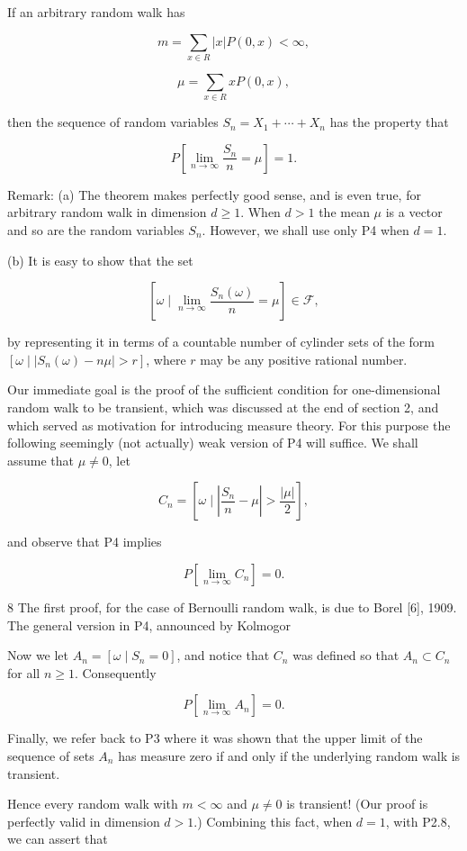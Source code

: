 If an arbitrary random walk has

$$m = \sum_{x \in R} |x| P(0,x) < \infty,$$

$$\mu = \sum_{x \in R} xP(0,x),$$

then the sequence of random variables $S_n = X_1 + \cdots + X_n$ has the property that

$$P\left[ \lim_{n \to \infty} \frac{S_n}{n} = \mu \right] = 1.$$

Remark: (a) The theorem makes perfectly good sense, and is even true, for arbitrary random walk in dimension $d \geq 1$. When $d > 1$ the mean $\mu$ is a vector and so are the random variables $S_n$. However, we shall use only P4 when $d = 1$.

(b) It is easy to show that the set

$$\left[ \omega \mid \lim_{n \to \infty} \frac{S_n(\omega)}{n} = \mu \right] \in \mathcal{F},$$

by representing it in terms of a countable number of cylinder sets of the form $[\omega \mid |S_n(\omega) - n\mu| > r]$, where $r$ may be any positive rational number.

Our immediate goal is the proof of the sufficient condition for one-dimensional random walk to be transient, which was discussed at the end of section 2, and which served as motivation for introducing measure theory. For this purpose the following seemingly (not actually) weak version of P4 will suffice. We shall assume that $\mu \neq 0$, let

$$C_n = \left[ \omega \mid \left| \frac{S_n}{n} - \mu \right| > \frac{|\mu|}{2} \right],$$

and observe that P4 implies

$$P\left[ \lim_{n \to \infty} C_n \right] = 0.$$

8 The first proof, for the case of Bernoulli random walk, is due to Borel [6], 1909. The general version in P4, announced by Kolmogor

Now we let $A_n = [\omega \mid S_n = 0]$, and notice that $C_n$ was defined so that $A_n \subset C_n$ for all $n \geq 1$. Consequently

$$P \left[ \lim_{n \to \infty} A_n \right] = 0.$$

Finally, we refer back to P3 where it was shown that the upper limit of the sequence of sets $A_n$ has measure zero if and only if the underlying random walk is transient.

Hence every random walk with $m < \infty$ and $\mu \neq 0$ is transient! (Our proof is perfectly valid in dimension $d > 1$.) Combining this fact, when $d = 1$, with P2.8, we can assert that